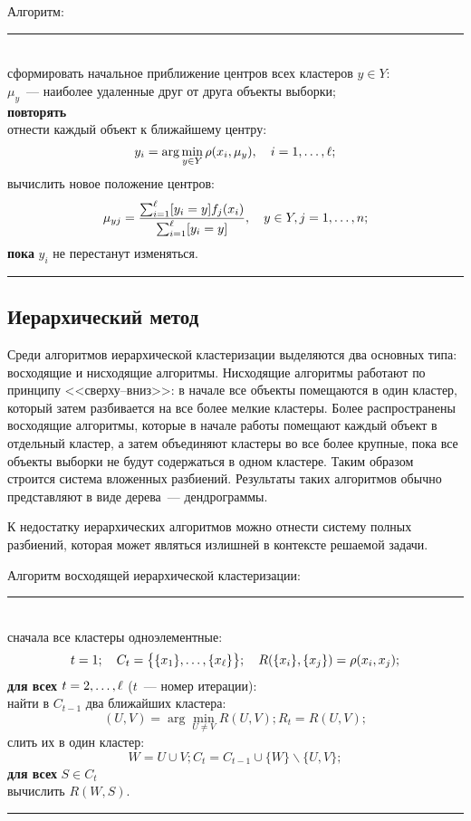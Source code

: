 Алгоритм:\\
\rule{\textwidth}{1pt}\\
сформировать начальное приближение центров всех кластеров \( y\in Y \):\\
\( \mu_y \)~--- наиболее удаленные друг от друга объекты выборки;\\
\textbf{повторять}\\
\indent отнести каждый объект к ближайшему центру:
\[
  y_i = \arg\min_{y\in Y}\rho(x_i, \mu_y), \quad i = 1, \ldots, \ell;
\]
\indent вычислить новое положение центров:
\[
  \mu_{yj} = \frac{\sum_{i=1}^\ell [y_i = y]f_j(x_i)}{\sum_{i=1}^\ell[y_i = y]}, \quad y\in Y, j = 1,\ldots, n;
\]
\textbf{пока} \( y_i \) не перестанут изменяться.\\
\rule{\textwidth}{1pt}

\subsection{Иерархический метод}
Среди алгоритмов иерархической кластеризации выделяются два основных типа: восходящие и нисходящие
алгоритмы. Нисходящие алгоритмы работают по принципу <<сверху--вниз>>: в начале все объекты помещаются
в один кластер, который затем разбивается на все более мелкие кластеры. Более распространены восходящие
алгоритмы, которые в начале работы помещают каждый объект в отдельный кластер, а затем объединяют
кластеры во все более крупные, пока все объекты выборки не будут содержаться в одном кластере. Таким
образом строится система вложенных разбиений. Результаты таких алгоритмов обычно представляют в виде
дерева~--- дендрограммы.

К недостатку иерархических алгоритмов можно отнести систему полных разбиений, которая может являться
излишней в контексте решаемой задачи.

Алгоритм восходящей иерархической кластеризации:\\
\rule{\textwidth}{1pt}\\
сначала все кластеры одноэлементные:
\[
  t = 1; \quad C_t = \bigl\{\{x_1\}, \ldots, \{ x_\ell \}\bigr\}; \quad R(\{ x_i \}, \{ x_j \}) = \rho(x_i, x_j);
\]
\textbf{для всех} \( t = 2, \ldots, \ell \) (\( t \)~--- номер итерации):\\
\indent найти в \( C_{t - 1} \) два ближайших кластера:
\[
  (U, V) = \arg\min_{U\ne V} R(U, V); R_t = R(U, V);
\]
\indent слить их в один кластер:
\[
  W = U\cup V; C_t = C_{t - 1}\cup\{ W \} \backslash \{ U, V \};
\]
\indent\textbf{для всех} \( S\in C_t \)\\
\indent\indent вычислить \( R(W, S) \).\\
\rule{\textwidth}{1pt}

